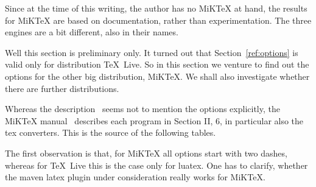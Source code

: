 \documentclass{article}
\newcommand{\texlive}{\TeX~Live}
\newcommand{\miktex}{MiKTeX}
\begin{document}
Since at the time of this writing, the author has no \miktex{} at hand, 
the results for \miktex{} are based on documentation, rather than experimentation. 
The three engines are a bit different, also in their names. 


Well this section is preliminary only. 
It turned out that Section~\ref{ref:options} is valid only for distribution \texlive. 
So in this section we venture to find out the options for the other big distribution, 
\miktex. 
We shall also investigate whether there are further distributions. 

Whereas the description~\cite{Texlive} seems not to mention the options explicitly, 
the \miktex{} manual~\cite{MiKTeX} describes each program in Section II, 6, 
in particular also the tex converters. 
This is the source of the following tables. 


The first observation is that, for \miktex{} all options start with two dashes, 
whereas for \texlive{} this is the case only for luatex. 
One has to clarify, whether the maven latex plugin under consideration really works for \miktex. 
\end{document}
